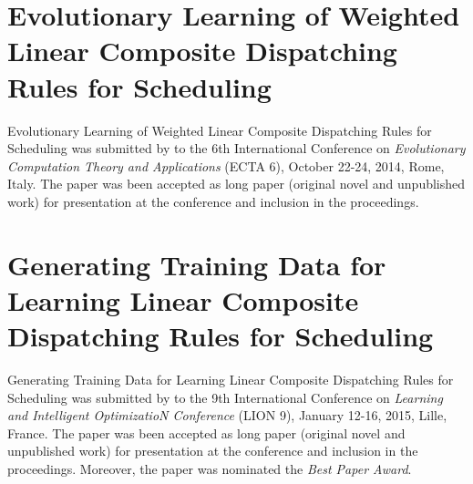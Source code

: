 

\section[ECTA6]{Evolutionary Learning of Weighted Linear Composite Dispatching 
 Rules for Scheduling}\label{app:ecta6}
Evolutionary Learning of Weighted Linear Composite Dispatching Rules for 
Scheduling was submitted by \citeauthor{InRu14} to the 6th International 
Conference on \emph{Evolutionary Computation Theory and Applications} (ECTA 6), 
October 22-24, 2014, Rome, Italy. 
The paper was been accepted as long paper (original novel and unpublished work) 
for presentation at the conference and inclusion in the proceedings. 

%

\section[LION9]{Generating Training Data for Learning Linear Composite 
 Dispatching Rules for Scheduling}\label{app:lion9}
Generating Training Data for Learning Linear Composite Dispatching Rules for 
Scheduling was submitted by \citeauthor{InRu15a} to the 9th International 
Conference on \emph{Learning and Intelligent OptimizatioN Conference} (LION 9), 
January 12-16, 2015, Lille, France. 
The paper was been accepted as long paper (original novel and unpublished work) 
for presentation at the conference and inclusion in the proceedings. 
Moreover, the paper was nominated the \emph{Best Paper Award}.


